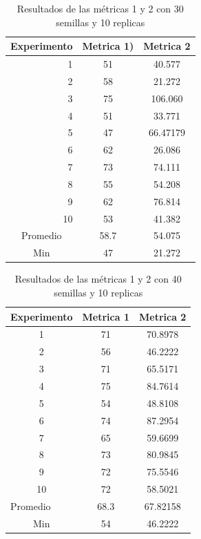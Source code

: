 \documentclass{article}
\begin{document}
\begin{center}
\begin{table}[htbp]
	\centering
	\caption{Resultados  de las métricas 1 y 2 con 30 semillas  y 10 replicas}
	\begin{tabular}{|c|c|c|}
		\hline
		Experimento  & \multicolumn{1}{l|}{Metrica 1)} & \multicolumn{1}{l|}{Metrica 2} \\
		\hline
		\multicolumn{1}{|r|}{1} & 51    & 40.577 \\
		\hline
		\multicolumn{1}{|r|}{2} & 58    & \cellcolor[rgb]{ .663,  .816,  .557}21.272 \\
			\hline
		\multicolumn{1}{|r|}{3} & 75    & 106.060 \\
			\hline
		\multicolumn{1}{|r|}{4} & 51    & 33.771 \\
		\hline
		\multicolumn{1}{|r|}{5} & \cellcolor[rgb]{ .663,  .816,  .557}47 & 66.47179 \\
			\hline
		\multicolumn{1}{|r|}{6} & 62    & 26.086 \\
			\hline
		\multicolumn{1}{|r|}{7} & 73    & 74.111 \\
			\hline
		\multicolumn{1}{|r|}{8} & 55    & 54.208 \\
			\hline
		\multicolumn{1}{|r|}{9} & 62    & 76.814 \\
			\hline
		\multicolumn{1}{|r|}{10} & 53    & 41.382 \\
			\hline
		Promedio & 58.7  & 54.075 \\
			\hline
		Min   & 47    & 21.272 \\
			\hline
	\end{tabular}%
	\label{tab:cuadro2}%
\end{table}%

\begin{table}[htbp]
	\centering
	\caption{Resultados  de las métricas 1 y 2 con 40 semillas  y 10 replicas}
	\begin{tabular}{|c|c|c|}
		\hline
		\multicolumn{1}{|l|}{Experimento } & \multicolumn{1}{l|}{Metrica 1} & \multicolumn{1}{p{5.39em}|}{Metrica 2} \\
		\hline
		1     & 71    & 70.8978 \\
		\hline
		2     & 56    & \cellcolor[rgb]{ .663,  .816,  .557}46.2222 \\
		\hline
		3     & 71    & 65.5171 \\
		\hline
		4     & 75    & 84.7614 \\
		\hline
		5     & \cellcolor[rgb]{ .663,  .816,  .557}54 & 48.8108 \\
		\hline
		6     & 74    & 87.2954 \\
		\hline
		7     & 65    & 59.6699 \\
		\hline
		8     & 73    & 80.9845 \\
		\hline
		9     & 72    & 75.5546 \\
		\hline
		10    & 72    & 58.5021 \\
		\hline
		\multicolumn{1}{|l|}{Promedio} & 68.3  & 67.82158 \\
		\hline
		Min & 54    & 46.2222 \\
		\hline
	\end{tabular}%
	\label{tab:addlabel}%
\end{table}%


\end{center}
\end{document}
